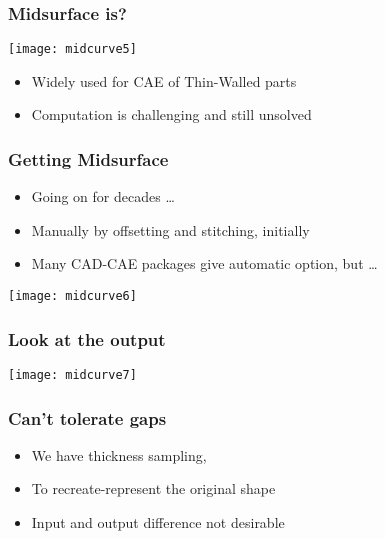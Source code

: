 \begin{frame}[fragile]\frametitle{Midsurface is?}
\begin{center}
\texttt{[image: midcurve5]}
\end{center}
	\begin{itemize}
	\item Widely used for CAE of Thin-Walled parts
	\item Computation is challenging and still unsolved
	\end{itemize}
	
\end{frame}

\begin{frame}[fragile]\frametitle{Getting Midsurface}

	\begin{itemize}
	\item Going on for decades \ldots
	\item Manually by offsetting and stitching, initially
	\item Many CAD-CAE packages give automatic option, but \ldots
	\end{itemize}
\begin{center}
\texttt{[image: midcurve6]}
\end{center}	
\end{frame}

\begin{frame}[fragile]\frametitle{Look at the output}
\begin{center}
\texttt{[image: midcurve7]}
\end{center}	
\end{frame}

\begin{frame}[fragile]\frametitle{Can't tolerate gaps}

	\begin{itemize}
	\item We have thickness sampling, 
	\item To recreate-represent the original shape
	\item Input and output difference not desirable
	\end{itemize}
\end{frame}


